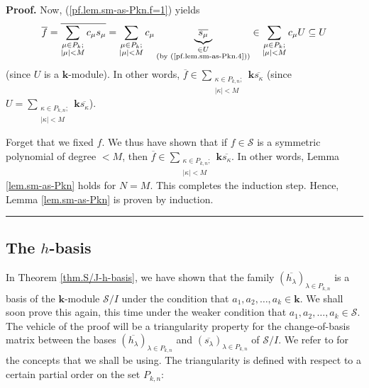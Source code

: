 \documentclass[numbers=enddot,12pt,final,onecolumn,notitlepage]{scrartcl}%
\theoremstyle{definition}
\newenvironment{proof}[1][Proof]{\noindent\textbf{#1.} }{\ \rule{0.5em}{0.5em}}
\let\sumnonlimits\sum
\renewcommand{\sum}{\sumnonlimits\limits}
\begin{document}
\begin{proof}
Now, (\ref{pf.lem.sm-as-Pkn.f=1}) yields%
\[
\overline{f}=\overline{\sum_{\substack{\mu\in P_{k};\\\left\vert
\mu\right\vert <M}}c_{\mu}s_{\mu}}=\sum_{\substack{\mu\in P_{k};\\\left\vert
\mu\right\vert <M}}c_{\mu}\underbrace{\overline{s_{\mu}}}_{\substack{\in
U\\\text{(by (\ref{pf.lem.sm-as-Pkn.4}))}}}\in\sum_{\substack{\mu\in
P_{k};\\\left\vert \mu\right\vert <M}}c_{\mu}U\subseteq U
\]
(since $U$ is a $\mathbf{k}$-module). In other words, $\overline{f}\in
\sum_{\substack{\kappa\in P_{k,n};\\\left\vert \kappa\right\vert
<M}}\mathbf{k}\overline{s_{\kappa}}$ (since $U=\sum_{\substack{\kappa\in
P_{k,n};\\\left\vert \kappa\right\vert <M}}\mathbf{k}\overline{s_{\kappa}}$).

Forget that we fixed $f$. We thus have shown that if $f\in\mathcal{S}$ is a
symmetric polynomial of degree $<M$, then $\overline{f}\in\sum
_{\substack{\kappa\in P_{k,n};\\\left\vert \kappa\right\vert <M}%
}\mathbf{k}\overline{s_{\kappa}}$. In other words, Lemma \ref{lem.sm-as-Pkn}
holds for $N=M$. This completes the induction step. Hence, Lemma
\ref{lem.sm-as-Pkn} is proven by induction.
\end{proof}

\subsection{The $h$-basis}

In Theorem \ref{thm.S/J-h-basis}, we have shown that the family $\left(
\overline{h_{\lambda}}\right)  _{\lambda\in P_{k,n}}$ is a basis of the
$\mathbf{k}$-module $\mathcal{S}/I$ under the condition that $a_{1}%
,a_{2},\ldots,a_{k}\in\mathbf{k}$. We shall soon prove this again, this time
under the weaker condition that $a_{1},a_{2},\ldots,a_{k}\in\mathcal{S}$. The
vehicle of the proof will be a triangularity property for the change-of-basis
matrix between the bases $\left(  \overline{h_{\lambda}}\right)  _{\lambda\in
P_{k,n}}$ and $\left(  \overline{s_{\lambda}}\right)  _{\lambda\in P_{k,n}}$
of $\mathcal{S}/I$. We refer to \cite[Definition 11.1.16(c)]{GriRei18} for the
concepts that we shall be using. The triangularity is defined with respect to
a certain partial order on the set $P_{k,n}$:
\end{document}
